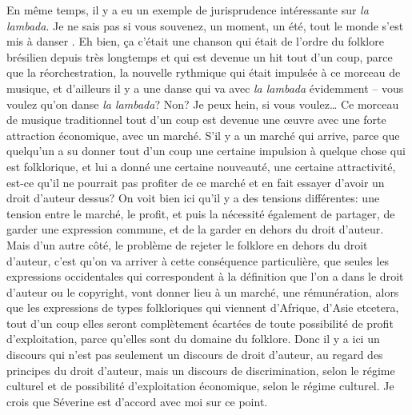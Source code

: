 {En m\^eme temps, il y a eu un exemple de jurisprudence int\'eressante
sur {\em la lambada}. Je ne sais pas si vous souvenez, un moment, un
\'et\'e, tout le monde s'est mis \`a danser . Eh bien, \c{c}a c'\'etait une chanson qui \'etait de
l'ordre du folklore br\'esilien depuis tr\`es longtemps et qui est
devenue un hit tout d'un coup, parce que la r\'eorchestration, la
nouvelle rythmique qui \'etait impuls\'ee \`a ce morceau de musique, et
d'ailleurs il y a une danse qui va avec {\em la lambada}
\'evidemment {--} vous voulez qu'on danse {\em la lambada}? Non? Je
peux hein, si vous voulez{\dots} Ce morceau de musique traditionnel
tout d'un coup est devenue une {\oe}uvre avec une forte attraction
\'economique, avec un march\'e. S'il y a un march\'e qui arrive, parce
que quelqu'un a su donner tout d'un coup une certaine impulsion \`a
quelque chose qui est folklorique, et lui a donn\'e une certaine
nouveaut\'e, une certaine attractivit\'e, est{}-ce qu'il ne pourrait
pas profiter de ce march\'e et en fait essayer d'avoir un droit
d'auteur dessus? On voit bien ici qu'il y a des tensions diff\'erentes:
une tension entre le march\'e, le profit, et puis la n\'ecessit\'e
\'egalement de partager, de garder une expression commune, et de la
garder en dehors du droit d'auteur. Mais d'un autre c\^ot\'e, le
probl\`eme de rejeter le folklore en dehors du droit d'auteur, c'est
qu'on va arriver \`a cette cons\'equence particuli\`ere, que seules les
expressions occidentales qui correspondent \`a la d\'efinition que l'on
a dans le droit d'auteur ou le copyright, vont donner lieu \`a un
march\'e, une r\'emun\'eration, alors que les expressions de types
folkloriques qui viennent d'Afrique, d'Asie etcetera, tout d'un coup
elles seront compl\`etement \'ecart\'ees de toute possibilit\'e de
profit d'exploitation, parce qu'elles sont du domaine du folklore. Donc
il y a ici un discours qui n'est pas seulement un discours de droit
d'auteur, au regard des principes du droit d'auteur, mais un discours
de discrimination, selon le r\'egime culturel et de possibilit\'e
d'exploitation \'economique, selon le r\'egime culturel. Je crois que
S\'everine est d'accord avec moi sur ce point.\par

}
